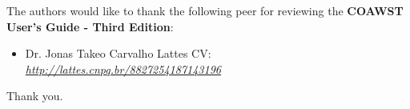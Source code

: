 \noindent The authors would like to thank the following peer for reviewing the \textbf{COAWST User's Guide - Third Edition}:
\bigskip

\begin{itemize}
    \item Dr. Jonas Takeo Carvalho \newline Lattes CV: \textit{\textcolor{bleu_cite}{\href{http://lattes.cnpq.br/8827254187143196}{http://lattes.cnpq.br/8827254187143196}}}
\end{itemize}

\bigskip
    Thank you. \\
